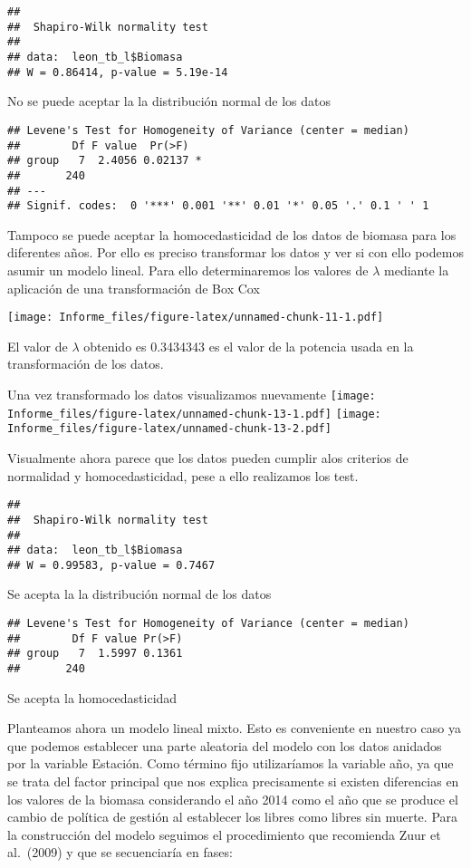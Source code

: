 \documentclass[
]{article}
\begin{document}
\begin{verbatim}
## 
##  Shapiro-Wilk normality test
## 
## data:  leon_tb_l$Biomasa
## W = 0.86414, p-value = 5.19e-14
\end{verbatim}

No se puede aceptar la la distribución normal de los datos

\begin{verbatim}
## Levene's Test for Homogeneity of Variance (center = median)
##        Df F value  Pr(>F)  
## group   7  2.4056 0.02137 *
##       240                  
## ---
## Signif. codes:  0 '***' 0.001 '**' 0.01 '*' 0.05 '.' 0.1 ' ' 1
\end{verbatim}

Tampoco se puede aceptar la homocedasticidad de los datos de biomasa
para los diferentes años. Por ello es preciso transformar los datos y
ver si con ello podemos asumir un modelo lineal. Para ello
determinaremos los valores de \(\lambda\) mediante la aplicación de una
transformación de Box Cox

\texttt{[image: Informe\_files/figure-latex/unnamed-chunk-11-1.pdf]}

El valor de \(\lambda\) obtenido es 0.3434343 es el valor de la potencia
usada en la transformación de los datos.

Una vez transformado los datos visualizamos nuevamente
\texttt{[image: Informe\_files/figure-latex/unnamed-chunk-13-1.pdf]}
\texttt{[image: Informe\_files/figure-latex/unnamed-chunk-13-2.pdf]}

Visualmente ahora parece que los datos pueden cumplir alos criterios de
normalidad y homocedasticidad, pese a ello realizamos los test.

\begin{verbatim}
## 
##  Shapiro-Wilk normality test
## 
## data:  leon_tb_l$Biomasa
## W = 0.99583, p-value = 0.7467
\end{verbatim}

Se acepta la la distribución normal de los datos

\begin{verbatim}
## Levene's Test for Homogeneity of Variance (center = median)
##        Df F value Pr(>F)
## group   7  1.5997 0.1361
##       240
\end{verbatim}

Se acepta la homocedasticidad

Planteamos ahora un modelo lineal mixto. Esto es conveniente en nuestro
caso ya que podemos establecer una parte aleatoria del modelo con los
datos anidados por la variable Estación. Como término fijo utilizaríamos
la variable año, ya que se trata del factor principal que nos explica
precisamente si existen diferencias en los valores de la biomasa
considerando el año 2014 como el año que se produce el cambio de
política de gestión al establecer los libres como libres sin muerte.
Para la construcción del modelo seguimos el procedimiento que recomienda
Zuur et al.~(2009) y que se secuenciaría en fases:
\end{document}
